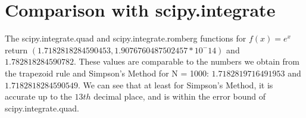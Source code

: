 \documentclass{article}
\begin{document}
\section{Comparison with scipy.integrate}
The scipy.integrate.quad and scipy.integrate.romberg functions for $f(x)=e^x$ return $(1.7182818284590453, 1.9076760487502457*10^-{14})$ and $1.782818284590782$. These values are comparable to the numbers we obtain from the trapezoid rule and Simpson's Method for N = 1000: $1.7182819716491953$ and $1.7182818284590549$. We can see that at least for Simpson's Method, it is accurate up to the $13th$ decimal place, and is within the error bound of scipy.integrate.quad. 
\end{document}
